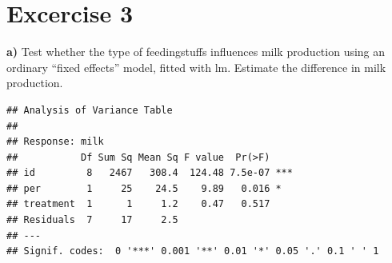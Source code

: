 \documentclass[
  10pt,
]{article}
\newenvironment{Shaded}{\begin{snugshade}}{\end{snugshade}}
\newcommand{\AttributeTok}[1]{\textcolor[rgb]{0.77,0.63,0.00}{#1}}
\newcommand{\CommentTok}[1]{\textcolor[rgb]{0.56,0.35,0.01}{\textit{#1}}}
\newcommand{\ConstantTok}[1]{\textcolor[rgb]{0.00,0.00,0.00}{#1}}
\newcommand{\FunctionTok}[1]{\textcolor[rgb]{0.00,0.00,0.00}{#1}}
\newcommand{\NormalTok}[1]{#1}
\newcommand{\OtherTok}[1]{\textcolor[rgb]{0.56,0.35,0.01}{#1}}
\newcommand{\SpecialCharTok}[1]{\textcolor[rgb]{0.00,0.00,0.00}{#1}}
\newcommand{\StringTok}[1]{\textcolor[rgb]{0.31,0.60,0.02}{#1}}
\begin{document}
\hypertarget{excercise-3}{%
\section{Excercise 3}\label{excercise-3}}

\textbf{a)} Test whether the type of feedingstuffs influences milk
production using an ordinary ``fixed effects'' model, fitted with lm.
Estimate the difference in milk production.

\begin{Shaded}
\end{Shaded}

\begin{verbatim}
## Analysis of Variance Table
## 
## Response: milk
##           Df Sum Sq Mean Sq F value  Pr(>F)    
## id         8   2467   308.4  124.48 7.5e-07 ***
## per        1     25    24.5    9.89   0.016 *  
## treatment  1      1     1.2    0.47   0.517    
## Residuals  7     17     2.5                    
## ---
## Signif. codes:  0 '***' 0.001 '**' 0.01 '*' 0.05 '.' 0.1 ' ' 1
\end{verbatim}
\end{document}
